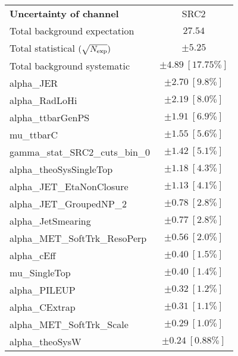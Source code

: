 
\begin{table}
\begin{center}
\setlength{\tabcolsep}{0.0pc}
\begin{tabular*}{\textwidth}{@{\extracolsep{\fill}}lc}
\noalign{\smallskip}\hline\noalign{\smallskip}
{\bf Uncertainty of channel}                                    & SRC2            \\
\noalign{\smallskip}\hline\noalign{\smallskip}
Total background expectation             &  $27.54$       \\
\noalign{\smallskip}\hline\noalign{\smallskip}
Total statistical $(\sqrt{N_{\rm exp}})$              & $\pm 5.25$       \\
Total background systematic               & $\pm 4.89\ [17.75\%] $             \\
\noalign{\smallskip}\hline\noalign{\smallskip}
\noalign{\smallskip}\hline\noalign{\smallskip}
alpha\_JER         & $\pm 2.70\ [9.8\%] $       \\
alpha\_RadLoHi         & $\pm 2.19\ [8.0\%] $       \\
alpha\_ttbarGenPS         & $\pm 1.91\ [6.9\%] $       \\
mu\_ttbarC         & $\pm 1.55\ [5.6\%] $       \\
gamma\_stat\_SRC2\_cuts\_bin\_0         & $\pm 1.42\ [5.1\%] $       \\
alpha\_theoSysSingleTop         & $\pm 1.18\ [4.3\%] $       \\
alpha\_JET\_EtaNonClosure         & $\pm 1.13\ [4.1\%] $       \\
alpha\_JET\_GroupedNP\_2         & $\pm 0.78\ [2.8\%] $       \\
alpha\_JetSmearing         & $\pm 0.77\ [2.8\%] $       \\
alpha\_MET\_SoftTrk\_ResoPerp         & $\pm 0.56\ [2.0\%] $       \\
alpha\_cEff         & $\pm 0.40\ [1.5\%] $       \\
mu\_SingleTop         & $\pm 0.40\ [1.4\%] $       \\
alpha\_PILEUP         & $\pm 0.32\ [1.2\%] $       \\
alpha\_CExtrap         & $\pm 0.31\ [1.1\%] $       \\
alpha\_MET\_SoftTrk\_Scale         & $\pm 0.29\ [1.0\%] $       \\
alpha\_theoSysW         & $\pm 0.24\ [0.88\%] $       \\

\end{tabular*}
\end{center}
\end{table}
